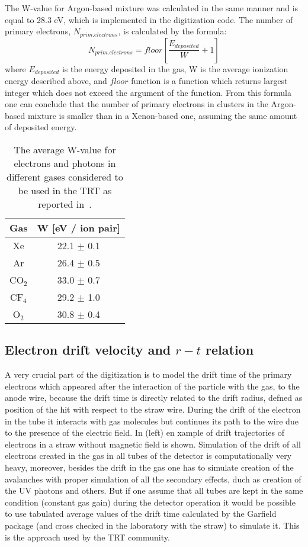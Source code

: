 The W-value for Argon-based mixture was calculated in the same manner and is equal to 28.3 eV, which is implemented in the digitization code.
The number of primary electrons, $N_{prim.electrons}$, is calculated by the formula:
\begin{equation}
 N_{prim.electrons} = floor \left[\dfrac{E_{deposited}}{W} + 1\right]
\end{equation}
where $E_{deposited}$ is the energy deposited in the gas, W is the average ionization energy described above, and $floor$ function is a function which returns
largest integer which does not exceed the argument of the function.
From this formula one can conclude that the number of primary electrons in clusters in the Argon-based mixture is smaller than in a Xenon-based one, 
assuming the same amount of deposited energy.

\begin{table}[p]
  \begin{tabular}{c|c}
    Gas & W [eV / ion pair]\\
    \hline
    Xe & 22.1 $\pm$ 0.1 \\
    Ar & 26.4 $\pm$ 0.5 \\
    CO$_2$ & 33.0 $\pm$ 0.7 \\
    CF$_4$ & 29.2 $\pm$ 1.0 \\
    O$_2$ & 30.8 $\pm$ 0.4 \\
  \end{tabular}
  \caption{The average W-value for electrons and photons in different gases considered to be used in the TRT as reported in~\cite{cwetanski_thesis}.}
  \label{tab:ionization_energy}
\end{table}

\subsection{Electron drift velocity and $r-t$ relation}

A very crucial part of the digitization is to model the drift time of the primary electrons which appeared after the interaction of the particle with the gas, to the anode wire, because the drift time is directly related to the drift radius, defned as position of the hit with respect to the straw wire.
During the drift of the electron in the tube it interacts with gas molecules but continues its path to the wire due to the presence of the electric field.
In  (left) en xample of drift trajectories of electrons in a straw without magnetic field is shown.
Simulation of the drift of all electrons created in the gas in all tubes of the detector is computationally very heavy,
moreover, besides the drift in the gas one has to simulate creation of the avalanches with proper simulation of all the secondary effects,
duch as creation of the UV photons and others. But if one assume that all tubes are kept in the same condition (constant gas gain) during the detector operation it would
be possible to use tabulated average values of the drift time calculated by the Garfield package (and cross checked in the laboratory with the straw) to simulate it.
This is the approach used by the TRT community. 

